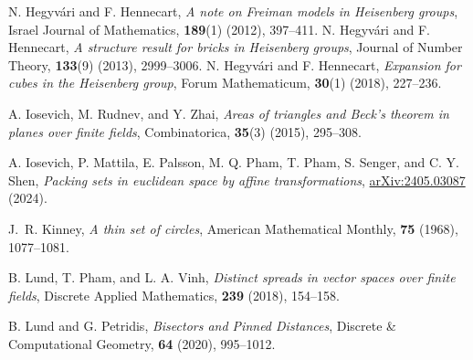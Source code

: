 \documentclass[11pt]{article}
\begin{document}
\begin{thebibliography}{}
N. Hegyvári and F. Hennecart, \textit{A note on Freiman models in Heisenberg groups}, Israel Journal of Mathematics, \textbf{189}(1) (2012), 397--411.
N. Hegyv\'{a}ri and F. Hennecart, \textit{A structure result for bricks in Heisenberg groups}, Journal of Number Theory, \textbf{133}(9) (2013), 2999--3006.
N. Hegyv\'{a}ri and F. Hennecart, \textit{Expansion for cubes in the Heisenberg group}, Forum Mathematicum, \textbf{30}(1) (2018), 227--236.








A. Iosevich, M. Rudnev, and Y. Zhai, \textit{Areas of triangles and Beck’s theorem in planes over finite fields}, Combinatorica, \textbf{35}(3) (2015), 295--308.

 A. Iosevich, P. Mattila, E. Palsson, M. Q. Pham, T. Pham, S. Senger, and C. Y. Shen, \textit{Packing sets in euclidean space by affine transformations}, \href{https://arxiv.org/pdf/2405.03087}{arXiv:2405.03087} (2024).


 J.~R. Kinney, {\em A thin set of circles}, American Mathematical Monthly, {\bf 75} (1968), 1077--1081.

 B. Lund, T. Pham, and L. A. Vinh, \textit{Distinct spreads in vector spaces over finite fields}, Discrete Applied Mathematics, \textbf{239} (2018), 154--158.

 B. Lund and G. Petridis, \textit{Bisectors and Pinned Distances}, Discrete \& Computational Geometry, \textbf{64} (2020), 995--1012. 




\end{thebibliography}
\end{document}
